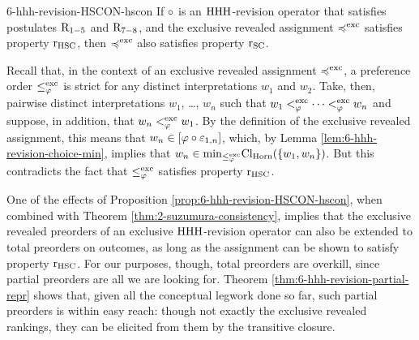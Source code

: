 \begin{prp}{}{6-hhh-revision-HSCON-hscon}%
	If $\circ$ is an ${\mathrm{HHH}}$-revision operator that
	satisfies postulates $\mathrm{R}_{1-5}$ and $\mathrm{R}_{7-8}$,
	and the exclusive revealed assignment $\preccurlyeq^{{\operatorname{exc}}}$ satisfies 
	property $\mathrm{r}_{{\mathrm{HSC}}}$, then
	$\preccurlyeq^{{\operatorname{exc}}}$ also satisfies property $\mathrm{r}_{{\mathrm{SC}}}$.
\end{prp}
\begin{prf*}{}{}%
	Recall that, in the context of an exclusive revealed assignment $\preccurlyeq^{{\operatorname{exc}}}$,
	a preference order $\le^{{\operatorname{exc}}}_{\varphi}$ is strict for any distinct interpretations 
	$w_1$ and $w_2$.
	Take, then, pairwise distinct interpretations 
	$w_1$, \dots, $w_n$ such that
	$w_1 <^{{\operatorname{exc}}}_{\varphi}\dots <^{{\operatorname{exc}}}_{\varphi} w_n$
	and suppose,
	in addition, that $w_n <^{{\operatorname{exc}}}_{\varphi} w_1$.
	By the definition of the exclusive revealed 
	assignment, 
	this means that $w_n\in[\varphi\circ\varepsilon_{1,n}]$,
	which, by Lemma \ref{lem:6-hhh-revision-choice-min},
	implies that $w_n\in{\operatorname{min}}_{\le^{{\operatorname{exc}}}_{\varphi}}{\operatorname{Cl}}_{\mathrm{Horn}}(\{w_1,w_n\})$.
	But this contradicts the fact that $\le^{{\operatorname{exc}}}_{\varphi}$
	satisfies property $\mathrm{r}_{{\mathrm{HSC}}}$.
\end{prf*}

One of the effects of Proposition \ref{prop:6-hhh-revision-HSCON-hscon}, 
when combined with Theorem \ref{thm:2-suzumura-consistency},
implies that the exclusive revealed preorders 
of an exclusive ${\mathrm{HHH}}$-revision operator can also be extended
to total preorders on outcomes, as long as the assignment can 
be shown to satisfy property $\mathrm{r}_{{\mathrm{HSC}}}$.
For our purposes, though, total preorders are overkill,
since partial preorders are all we are looking for.
Theorem \ref{thm:6-hhh-revision-partial-repr} shows that,
given all the conceptual legwork done so far, 
such partial preorders is within easy reach:
though not exactly the exclusive revealed rankings,
they can be elicited from them by the transitive closure.

